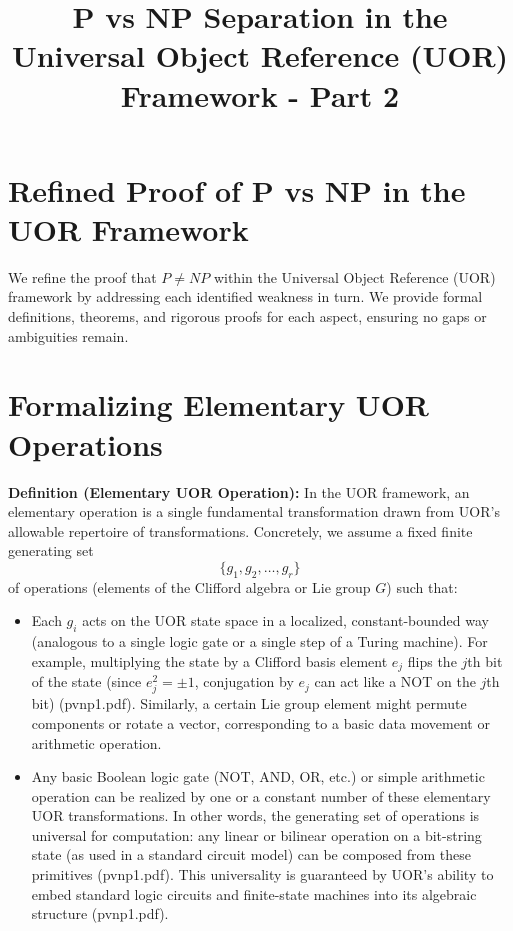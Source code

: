 \documentclass{article}
\title{P vs NP Separation in the Universal Object Reference (UOR) Framework - Part 2}
\author{}
\date{}
\begin{document}
\maketitle

\section*{Refined Proof of P vs NP in the UOR Framework}
We refine the proof that $P \neq NP$ within the Universal Object Reference (UOR) framework by addressing each identified weakness in turn. We provide formal definitions, theorems, and rigorous proofs for each aspect, ensuring no gaps or ambiguities remain.

\section{Formalizing Elementary UOR Operations}

\textbf{Definition (Elementary UOR Operation):} In the UOR framework, an elementary operation is a single fundamental transformation drawn from UOR’s allowable repertoire of transformations. Concretely, we assume a fixed finite generating set 
\[
\{g_1, g_2, \dots, g_r\}
\]
of operations (elements of the Clifford algebra or Lie group $G$) such that:
\begin{itemize}
    \item Each $g_i$ acts on the UOR state space in a localized, constant-bounded way (analogous to a single logic gate or a single step of a Turing machine). For example, multiplying the state by a Clifford basis element $e_j$ flips the $j$th bit of the state (since $e_j^2 = \pm 1$, conjugation by $e_j$ can act like a NOT on the $j$th bit) (pvnp1.pdf). Similarly, a certain Lie group element might permute components or rotate a vector, corresponding to a basic data movement or arithmetic operation.
    \item Any basic Boolean logic gate (NOT, AND, OR, etc.) or simple arithmetic operation can be realized by one or a constant number of these elementary UOR transformations. In other words, the generating set of operations is universal for computation: any linear or bilinear operation on a bit-string state (as used in a standard circuit model) can be composed from these primitives (pvnp1.pdf). This universality is guaranteed by UOR’s ability to embed standard logic circuits and finite-state machines into its algebraic structure (pvnp1.pdf).
\end{itemize}
\end{document}
